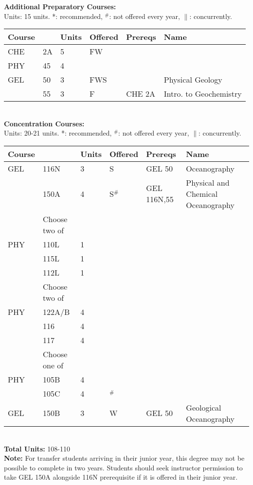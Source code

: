 \documentclass[12pt]{article}
\begin{document}
\newpage
{}
\vskip 0.25cm
\noindent
{\bf Additional Preparatory Courses:  }\\
Units:  15 units. *: recommended, $^\#$: not offered every year, $\parallel$: concurrently.\\
\begin{tabular}{|llllll|}
\hline
Course & & Units & Offered & Prereqs & Name \\
\hline
CHE  & 2A     & 5 & FW  & & \\
PHY  & 45     & 4 &     & & \\
GEL  & 50     & 3 & FWS & & Physical Geology \\
     & 55     & 3 & F      & CHE 2A & Intro. to Geochemistry\\
\hline
\end{tabular}\\
\vskip 0.25cm
\noindent
{\bf Concentration Courses:  }\\
Units:  20-21 units. *: recommended, $^\#$: not offered every year, $\parallel$: concurrently.\\
\begin{tabular}{|llllll|}
\hline
Course & & Units & Offered & Prereqs & Name \\
\hline
GEL  & 116N   & 3 & S      & GEL 50          & Oceanography\\
     & 150A   & 4 & S$^\#$ & GEL 116N,55 & Physical and Chemical Oceanography\\
\hline
    & Choose two of & & & & \\
\hline
PHY & 110L & 1 & & & \\
    & 115L & 1 & & & \\
    & 112L & 1 & & & \\
\hline
\hline
    & Choose two of & & & & \\
\hline
PHY & 122A/B & 4 & & & \\
    & 116   & 4 & & & \\
    & 117   & 4 & & & \\
\hline
\hline
    & Choose one of & & & & \\
\hline
PHY & 105B & 4 & & & \\
    & 105C & 4 & $^\#$ & & \\
GEL & 150B & 3 & W & GEL 50 & Geological Oceanography\\
\hline
\end{tabular}\\
\vskip 0.25cm
\noindent
{\bf Total Units:} 108-110\\
{\bf Note: } For transfer students arriving in their junior year, this
degree may not be possible to complete in two years.  Students should
seek instructor permission to take GEL 150A alongside 116N prerequisite if
it is offered in their junior year.\\
\end{document}
